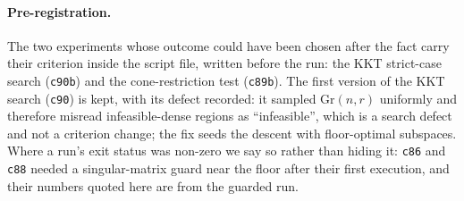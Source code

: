 \documentclass[journal]{IEEEtran}
\theoremstyle{remark}
\begin{document}
\paragraph{Pre-registration.} The two experiments whose outcome could have been
chosen after the fact carry their criterion inside the script file, written
before the run: the KKT strict-case search (\texttt{c90b}) and the
cone-restriction test (\texttt{c89b}). The first version of the KKT search
(\texttt{c90}) is kept, with its defect recorded: it sampled
$\mathrm{Gr}(n,r)$ uniformly and therefore misread infeasible-dense regions as
``infeasible'', which is a search defect and not a criterion change; the fix
seeds the descent with floor-optimal subspaces. Where a run's exit status was
non-zero we say so rather than hiding it: \texttt{c86} and \texttt{c88} needed a
singular-matrix guard near the floor after their first execution, and their
numbers quoted here are from the guarded run.
\end{document}
